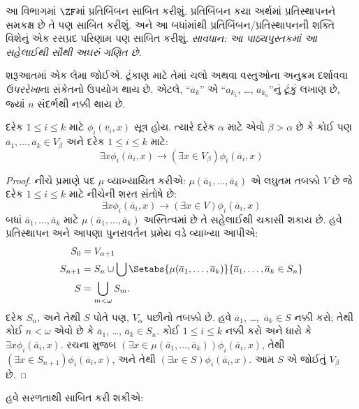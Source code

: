 આ વિભાગમાં $\ZF$માં પ્રતિબિંબન સાબિત કરીશું. પ્રતિબિંબન
કયા અર્થમાં પ્રતિસ્થાપનને સમકક્ષ છે તે પણ સાબિત કરીશું.
અને આ બધાંમાંથી પ્રતિબિંબન/પ્રતિસ્થાપનની શક્તિ વિશેનું
એક રસપ્રદ પરિણામ પણ સાબિત કરીશું. \emph{સાવધાન:
આ પાઠ્યપુસ્તકમાં આ સહેલાઈથી સૌથી અઘરું ગણિત છે.}

શરૂઆતમાં એક લેમા જોઈએ. ટૂંકાણ માટે તેમાં ચલો અથવા
વસ્તુઓના અનુક્રમ દર્શાવવા \emph{ઉપરરેખા}ના સંકેતનો
ઉપયોગ થાય છે. એટલે, ``$\overline{a}_k$'' એ
``$a_{k_1}$, \dots, $a_{k_n}$''નું ટૂંકું લખાણ છે,
જ્યાં $n$ સંદર્ભથી નક્કી થાય છે.

\begin{lem}
દરેક $1 \leq i \leq k$ માટે
$\phi_i(\overline{v}_i, x)$ સૂત્ર હોય. ત્યારે દરેક
$\alpha$ માટે એવો $\beta > \alpha$ છે કે કોઈ પણ
$\overline{a}_1, \ldots, \overline{a}_k \in V_\beta$
અને દરેક $1 \leq i \leq k$ માટે:
\[
	\exists x\phi_i(\overline{a}_i, x) \rightarrow (\exists x \in V_\beta) \phi_i(\overline{a}_i, x)
\]
\end{lem}

\begin{proof}
નીચે પ્રમાણે પદ $\mu$ વ્યાખ્યાયિત કરીએ:
$\mu(\overline{a}_1, \ldots,
\overline{a}_k)$ એ લઘુતમ તબક્કો $V$ છે જે દરેક
$1 \leq i \leq k$ માટે નીચેની શરત સંતોષે છે:
\[
\exists x\phi_i(\overline{a}_i, x) \rightarrow (\exists x \in V) \phi_i(\overline{a}_i, x)
\]
બધાં $\overline{a}_1, \ldots, \overline{a}_k$
માટે $\mu(\overline{a}_1, \ldots, \overline{a}_k)$
અસ્તિત્વમાં છે તે સહેલાઈથી ચકાસી શકાય છે. હવે
પ્રતિસ્થાપન અને આપણા પુનરાવર્તન પ્રમેય વડે વ્યાખ્યા આપીએ:
\begin{align*}
	S_0 & = V_{\alpha+1}\\
	S_{n+1} & = S_n \cup \bigcup
	\Setabs{\mu(\overline{a}_1, \ldots, \overline{a}_k)}
	{\overline{a}_1, \ldots, \overline{a}_k \in S_n} \\
	S &= \bigcup_{m < \omega} S_m.
\end{align*}
દરેક $S_n$, અને તેથી $S$ પોતે પણ, $V_\alpha$
પછીનો તબક્કો છે. હવે $\overline{a}_1$,
\dots,~$\overline{a}_k \in S$ નક્કી કરો; તેથી કોઈ
$n < \omega$ એવો છે કે $\overline{a}_1$,
\dots, $\overline{a}_k \in S_n$. કોઈ
$1 \leq i \leq k$ નક્કી કરો અને ધારો કે
$\exists x \phi_i(\overline{a}_i,x)$. રચના મુજબ
$(\exists x \in \mu(\overline{a}_1,
\ldots, \overline{a}_k))\phi_i(\overline{a}_i, x)$,
તેથી $(\exists x \in S_{n+1})\phi_i(\overline{a}_i, x)$,
અને તેથી $(\exists x \in S)\phi_i(\overline{a}_i, x)$.
આમ $S$ એ જોઈતું $V_\beta$ છે.
\end{proof}
\noindent
હવે  સરળતાથી
સાબિત કરી શકીએ:

